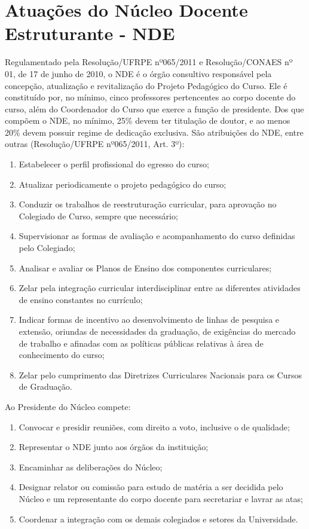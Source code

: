 \documentclass[
	12pt,				%
	openright,			%
  oneside,     %
	a4paper,			%
	chapter=TITLE,		%
	english,			%
	french,				%
	spanish,			%
	brazil				%
	]{abntex2}
\begin{document}
\section{Atuações do Núcleo Docente Estruturante - NDE}

Regulamentado pela Resolução/UFRPE nº065/2011 e Resolução/CONAES nº 01, de 17 de junho de 2010, o NDE é o órgão consultivo responsável pela concepção, atualização e revitalização do Projeto Pedagógico do Curso. Ele é constituído por, no mínimo, cinco professores pertencentes ao corpo docente do curso, além do Coordenador do Curso que exerce a função de presidente. Dos que compõem o NDE, no mínimo, 25\% devem ter titulação de doutor, e ao menos 20\% devem possuir regime de dedicação exclusiva. São atribuições do NDE, entre outras (Resolução/UFRPE nº065/2011, Art. 3º):

\begin{enumerate}
    \item Estabelecer o perfil profissional do egresso do curso; 	
    \item Atualizar periodicamente o projeto pedagógico do curso; 	
    \item Conduzir os trabalhos de reestruturação curricular, para aprovação no Colegiado de Curso, sempre que necessário;
    \item Supervisionar as formas de avaliação e acompanhamento do curso definidas pelo Colegiado; 	
    \item Analisar e avaliar os Planos de Ensino dos componentes curriculares;
    \item Zelar pela integração curricular interdisciplinar entre as diferentes atividades de ensino constantes no currículo; 	
    \item Indicar formas de incentivo ao desenvolvimento de linhas de pesquisa e extensão, oriundas de necessidades da graduação, de exigências do mercado de trabalho e afinadas com as políticas públicas relativas à área de conhecimento do curso; 	
    \item Zelar pelo cumprimento das Diretrizes Curriculares Nacionais para os Cursos de Graduação.
\end{enumerate}

Ao Presidente do Núcleo compete:

\begin{enumerate}
    \item Convocar e presidir reuniões, com direito a voto, inclusive o de qualidade;
    \item Representar o NDE junto aos 	órgãos da instituição; 	
    \item Encaminhar as deliberações do Núcleo; 	
    \item Designar relator ou comissão 	para estudo de matéria a ser decidida pelo Núcleo e um representante do corpo docente para secretariar e lavrar as atas;
    \item Coordenar a integração com os demais colegiados e setores da Universidade.
\end{enumerate}
\end{document}

